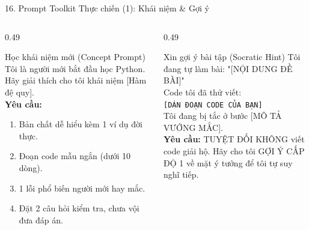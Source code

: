 \documentclass[aspectratio=169, 10pt]{beamer}
\begin{document}
\begin{frame}{16. Prompt Toolkit Thực chiến (1): Khái niệm \& Gợi ý}
  \begin{columns}[T]
    \begin{column}{0.49\textwidth}
      \begin{cbox}[primaryblue]{Học khái niệm mới (Concept Prompt)}
        \scriptsize
        Tôi là người mới bắt đầu học Python. Hãy giải thích cho tôi khái niệm [Hàm đệ quy].\\[2pt]
        \textbf{Yêu cầu:}
        \begin{enumerate}\setlength{\itemsep}{1pt}
          \item Bản chất dễ hiểu kèm 1 ví dụ đời thực.
          \item Đoạn code mẫu ngắn (dưới 10 dòng).
          \item 1 lỗi phổ biến người mới hay mắc.
          \item Đặt 2 câu hỏi kiểm tra, chưa vội đưa đáp án.
        \end{enumerate}
      \end{cbox}
    \end{column}
    \begin{column}{0.49\textwidth}
      \begin{cbox}[secondarygreen]{Xin gợi ý bài tập (Socratic Hint)}
        \scriptsize
        Tôi đang tự làm bài: "[NỘI DUNG ĐỀ BÀI]"\\[2pt]
        Code tôi đã thử viết:\\
        \texttt{[DÁN ĐOẠN CODE CỦA BẠN]}\\[2pt]
        Tôi đang bị tắc ở bước [MÔ TẢ VƯỚNG MẮC].\\[2pt]
        \textbf{Yêu cầu:} TUYỆT ĐỐI KHÔNG viết code giải hộ. Hãy cho tôi GỢI Ý CẤP ĐỘ 1 về mặt ý tưởng để tôi tự suy nghĩ tiếp.
      \end{cbox}
    \end{column}
  \end{columns}
\end{frame}
\end{document}
